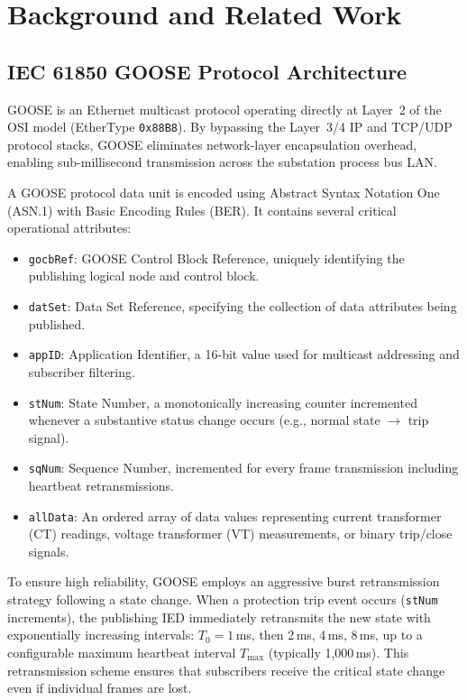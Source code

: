 \documentclass[journal]{IEEEtran}
\begin{document}
\section{Background and Related Work}

\subsection{IEC 61850 GOOSE Protocol Architecture}
GOOSE is an Ethernet multicast protocol operating directly at Layer~2 of the OSI model (EtherType \texttt{0x88B8}). By bypassing the Layer~3/4 IP and TCP/UDP protocol stacks, GOOSE eliminates network-layer encapsulation overhead, enabling sub-millisecond transmission across the substation process bus LAN.

A GOOSE protocol data unit is encoded using Abstract Syntax Notation One (ASN.1) with Basic Encoding Rules (BER). It contains several critical operational attributes:
\begin{itemize}[leftmargin=*]
    \item \texttt{gocbRef}: GOOSE Control Block Reference, uniquely identifying the publishing logical node and control block.
    \item \texttt{datSet}: Data Set Reference, specifying the collection of data attributes being published.
    \item \texttt{appID}: Application Identifier, a 16-bit value used for multicast addressing and subscriber filtering.
    \item \texttt{stNum}: State Number, a monotonically increasing counter incremented whenever a substantive status change occurs (e.g., normal state $\rightarrow$ trip signal).
    \item \texttt{sqNum}: Sequence Number, incremented for every frame transmission including heartbeat retransmissions.
    \item \texttt{allData}: An ordered array of data values representing current transformer (CT) readings, voltage transformer (VT) measurements, or binary trip/close signals.
\end{itemize}

To ensure high reliability, GOOSE employs an aggressive burst retransmission strategy following a state change. When a protection trip event occurs (\texttt{stNum} increments), the publishing IED immediately retransmits the new state with exponentially increasing intervals: $T_0 = 1$\,ms, then 2\,ms, 4\,ms, 8\,ms, up to a configurable maximum heartbeat interval $T_{\max}$ (typically 1,000\,ms). This retransmission scheme ensures that subscribers receive the critical state change even if individual frames are lost.
\end{document}
